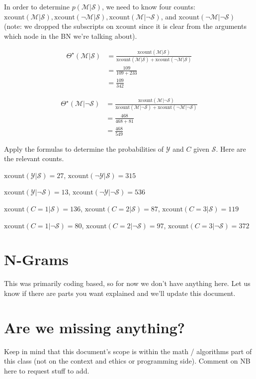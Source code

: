 \documentclass{tufte-handout}
\begin{document}
\item In order to determine $p(\mathcal{M} | \mathcal{S})$, we need to know four counts: $\mbox{xcount}(\mathcal{M}| \mathcal{S}), \mbox{xcount}(\neg \mathcal{M}| \mathcal{S}), \mbox{xcount}(\mathcal{M}|\neg \mathcal{S})$, and $\mbox{xcount}(\neg \mathcal{M}|\neg \mathcal{S})$ (note: we dropped the subscripts on $\mbox{xcount}$ since it is clear from the arguments which node in the BN we're talking about).

\begin{align}
\Theta^\star(\mathcal{M}|  \mathcal{S}) &= \frac{\mbox{xcount}(\mathcal{M}| \mathcal{S})}{\mbox{xcount}(\mathcal{M}| \mathcal{S}) + \mbox{xcount}(\neg \mathcal{M}|  \mathcal{S}) } \nonumber \\
&= \frac{109}{109+233} \nonumber \\
&= \frac{109}{342} \nonumber
\end{align}

\begin{align}
\Theta^\star(\mathcal{M}| \neg \mathcal{S}) &= \frac{\mbox{xcount}(\mathcal{M}| \neg \mathcal{S})}{\mbox{xcount}(\mathcal{M}| \neg \mathcal{S}) + \mbox{xcount}(\neg \mathcal{M}| \neg \mathcal{S}) } \nonumber \\
&= \frac{468}{468+81} \nonumber \\
&= \frac{468}{549} \nonumber
\end{align}

\begin{exercise}
Apply the formulas to determine the probabilities of $\mathcal{Y}$ and $C$ given $\mathcal{S}$.  Here are the relevant counts.

\bi
\item $\mbox{xcount}(\mathcal{Y}|  \mathcal{S}) = 27$,  $\mbox{xcount}(\neg \mathcal{Y}|  \mathcal{S}) = 315$
\item $\mbox{xcount}(\mathcal{Y}| \neg \mathcal{S}) = 13$,  $\mbox{xcount}(\neg \mathcal{Y}| \neg \mathcal{S}) = 536$
\item $\mbox{xcount}(C=1 | \mathcal{S}) = 136$, $\mbox{xcount}(C=2 | \mathcal{S}) = 87$, $\mbox{xcount}(C=3 | \mathcal{S}) = 119$
\item $\mbox{xcount}(C=1 | \neg \mathcal{S}) = 80$, $\mbox{xcount}(C=2 | \neg \mathcal{S}) = 97$, $\mbox{xcount}(C=3 | \neg \mathcal{S}) = 372$
\ei

\end{exercise}

\ei



\section{N-Grams}
This was primarily coding based, so for now we don't have anything here.  Let us know if there are parts you want explained and we'll update this document.

\section{Are we missing anything?}
Keep in mind that this document's scope is within the math / algorithms part of this class (not on the context and ethics or programming side).  Comment on NB here to request stuff to add. 
\end{document}
